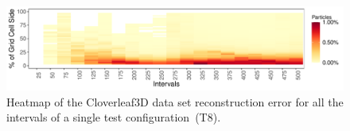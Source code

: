 \begin{figure}[!b]
\vspace{-2mm}
\centering
\includegraphics[width=\linewidth]{Images/Clover_Intervals_T8.pdf}
\caption{Heatmap of the Cloverleaf3D data set reconstruction error for all the intervals of a single test configuration~(T8).}
\vspace{-2mm}
\label{fig:clover_map}
\end{figure}
